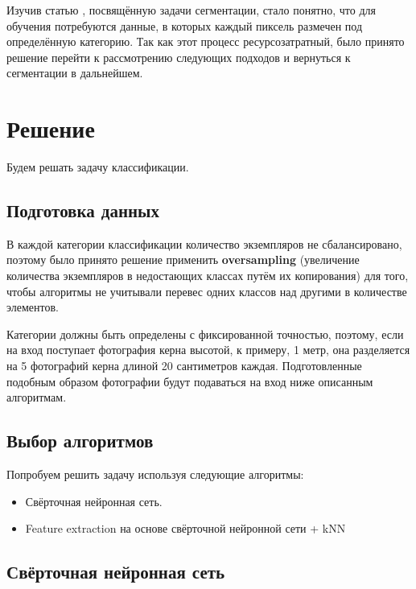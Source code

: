 \documentclass[14pt]{matmex-diploma}
\begin{document}
        Изучив статью \cite{paper:segmentation}, посвящённую задачи сегментации, стало понятно, что для обучения потребуются данные, в которых каждый пиксель размечен под определённую категорию. Так как этот процесс ресурсозатратный, было принято решение перейти к рассмотрению следующих подходов и вернуться к сегментации в дальнейшем.  
        
        
        
        
        
\section{Решение}
        
    Будем решать задачу классификации.    

    \subsection{Подготовка данных}
            
        В каждой категории классификации количество экземпляров не сбалансировано, поэтому было принято решение применить \textbf{oversampling} (увеличение количества экземпляров в недостающих классах путём их копирования) для того, чтобы алгоритмы не учитывали перевес одних классов над другими в количестве элементов.
        
        Категории должны быть определены с фиксированной точностью, поэтому, если на вход поступает фотография керна высотой, к примеру, 1 метр, она разделяется на 5 фотографий керна длиной 20 сантиметров каждая. Подготовленные подобным образом фотографии будут подаваться на вход ниже описанным алгоритмам.

    \subsection{Выбор алгоритмов}
    
        Попробуем решить задачу используя следующие алгоритмы:
        
        \begin{itemize}
            \item Свёрточная нейронная сеть.
            \item Feature extraction на основе свёрточной нейронной сети + kNN
        \end{itemize}
    
    \subsection{Свёрточная нейронная сеть}
    
\end{document}
